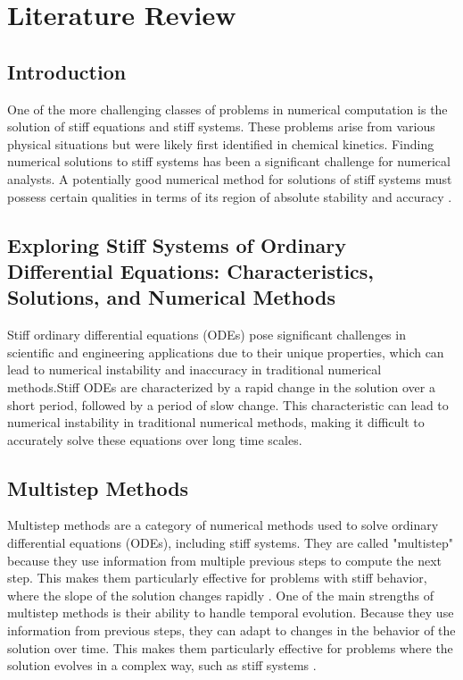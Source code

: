 \raggedbottom
\chapter{Literature Review}

\section{Introduction}
One of the more challenging classes of problems in numerical computation is the solution of stiff equations and stiff systems. These problems arise from various physical situations but were likely first identified in chemical kinetics. Finding numerical solutions to stiff systems has been a significant challenge for numerical analysts. A potentially good numerical method for solutions of stiff systems must possess certain qualities in terms of its region of absolute stability and accuracy \cite{QURESH2024}.




\section{Exploring Stiff Systems of Ordinary Differential Equations: Characteristics, Solutions, and Numerical Methods}

Stiff ordinary differential equations (ODEs) pose significant challenges in scientific and engineering applications due to their unique properties, which can lead to numerical instability and inaccuracy in traditional numerical methods.Stiff ODEs are characterized by a rapid change in the solution over a short period, followed by a period of slow change. This characteristic can lead to numerical instability in traditional numerical methods, making it difficult to accurately solve these equations over long time scales.


\section{Multistep Methods}
Multistep methods are a category of numerical methods used to solve ordinary differential equations (ODEs), including stiff systems. They are called "multistep" because they use information from multiple previous steps to compute the next step. This makes them particularly effective for problems with stiff behavior, where the slope of the solution changes rapidly \cite{math7121158}.
One of the main strengths of multistep methods is their ability to handle temporal evolution. Because they use information from previous steps, they can adapt to changes in the behavior of the solution over time. This makes them particularly effective for problems where the solution evolves in a complex way, such as stiff systems \cite{math7121158}.

